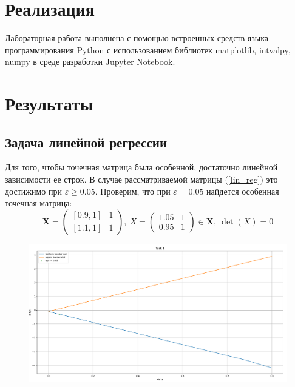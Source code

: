 \documentclass[12pt,a4paper]{article}
\begin{document}
	\section{Реализация}
		Лабораторная работа выполнена с помощью встроенных средств языка программирования Python с использованием библиотек matplotlib, intvalpy, numpy в среде разработки Jupyter Notebook. 
		\pagebreak
		
	
	
	\section{Результаты}
        \subsection{Задача линейной регрессии}
	        Для того, чтобы точечная матрица была особенной, достаточно линейной зависимости ее строк. В случае рассматриваемой матрицы (\ref{lin_reg}) это достижимо при $\varepsilon\geq0.05$. Проверим, что при $\varepsilon=0.05$ найдется особенная точечная матрица:
            \begin{equation*}
                \mathbf{X}=\begin{pmatrix}
              [0.9, 1]& 1\\
              [1.1, 1]& 1
            \end{pmatrix},\: X=\begin{pmatrix}
              1.05& 1\\
              0.95& 1
            \end{pmatrix}\in\mathbf{X},\:\det(X)=0
            \end{equation*}

            \begin{figure}[H]
                \centering
                \includegraphics[width=16cm]{eps-0.05.png}
            \end{figure}
\end{document}
